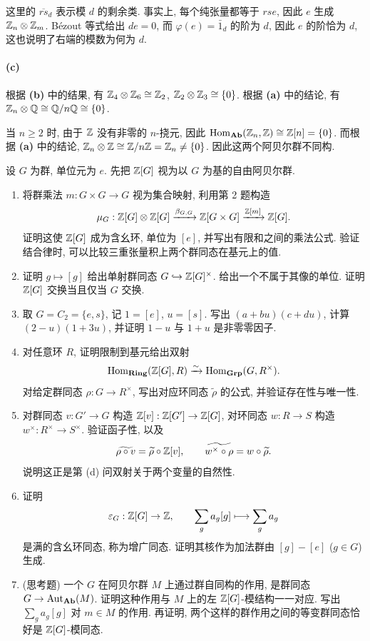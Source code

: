\documentclass{article}
\begin{document}
\begin{solution}
	这里的 $\overline{rs}_d$ 表示模 $d$ 的剩余类. 事实上, 每个纯张量都等于 $rs e$, 因此 $e$ 生成 $\mathbb{Z}_n \otimes \mathbb{Z}_m$. Bézout 等式给出 $de = 0$, 而 $\varphi(e) = \bar{1}_d$ 的阶为 $d$, 因此 $e$ 的阶恰为 $d$, 这也说明了右端的模数为何为 $d$.

	\paragraph{(c)} 根据 \textbf{(b)} 中的结果, 有 $\mathbb{Z}_4 \otimes \mathbb{Z}_6 \cong \mathbb{Z}_2$, $\mathbb{Z}_2 \otimes \mathbb{Z}_3 \cong \{0\}$. 根据 \textbf{(a)} 中的结论, 有 $\mathbb{Z}_n \otimes \mathbb{Q} \cong \mathbb{Q} / n\mathbb{Q} \cong \{0\}	$.

	当 $n \ge 2$ 时, 由于 $\mathbb{Z}$ 没有非零的 $n$-挠元, 因此 $\operatorname{Hom}_{\mathbf{Ab}}(\mathbb{Z}_n, \mathbb{Z}) \cong \mathbb{Z}[n] = \{0\}$. 而根据 \textbf{(a)} 中的结论, $\mathbb{Z}_n \otimes \mathbb{Z} \cong \mathbb{Z}/n\mathbb{Z} = \mathbb{Z}_n \neq \{0\}$. 因此这两个阿贝尔群不同构.
\end{solution}



\begin{problem}
设 $G$ 为群, 单位元为 $e$. 先把 $\mathbb{Z}[G]$ 视为以 $G$ 为基的自由阿贝尔群.
\begin{enumerate}
  \item[(a)] 将群乘法 $m:G\times G\to G$ 视为集合映射, 利用第 2 题构造
  \[
    \mu_G:\mathbb{Z}[G]\otimes\mathbb{Z}[G]\xrightarrow{\beta_{G,G}}\mathbb{Z}[G\times G]
    \xrightarrow{\mathbb{Z}[m]}\mathbb{Z}[G].
  \]
  证明这使 $\mathbb{Z}[G]$ 成为含幺环, 单位为 $[e]$, 并写出有限和之间的乘法公式. 验证结合律时, 可以比较三重张量积上两个群同态在基元上的值.
  \item[(b)] 证明 $g\mapsto[g]$ 给出单射群同态 $G\hookrightarrow\mathbb{Z}[G]^\times$. 给出一个不属于其像的单位. 证明 $\mathbb{Z}[G]$ 交换当且仅当 $G$ 交换.
  \item[(c)] 取 $G=C_2=\{e,s\}$, 记 $1=[e]$, $u=[s]$. 写出 $(a+bu)(c+du)$, 计算 $(2-u)(1+3u)$, 并证明 $1-u$ 与 $1+u$ 是非零零因子.
  \item[(d)] 对任意环 $R$, 证明限制到基元给出双射
  \[
    \operatorname{Hom}_{\mathbf{Ring}}(\mathbb{Z}[G],R)\xrightarrow{\sim}\operatorname{Hom}_{\mathbf{Grp}}(G,R^\times).
  \]
  对给定群同态 $\rho:G\to R^\times$, 写出对应环同态 $\widetilde\rho$ 的公式, 并验证存在性与唯一性.
  \item[(e)] 对群同态 $v:G'\to G$ 构造 $\mathbb{Z}[v]:\mathbb{Z}[G']\to\mathbb{Z}[G]$, 对环同态 $w:R\to S$ 构造 $w^\times:R^\times\to S^\times$. 验证函子性, 以及
  \[
    \widetilde{\rho\circ v}=\widetilde\rho\circ\mathbb{Z}[v],\qquad
    \widetilde{w^\times\circ\rho}=w\circ\widetilde\rho.
  \]
  说明这正是第 (d) 问双射关于两个变量的自然性.
  \item[(f)] 证明
  \[
    \varepsilon_G:\mathbb{Z}[G]\to\mathbb{Z},\qquad
    \sum_g a_g[g]\longmapsto\sum_g a_g
  \]
  是满的含幺环同态, 称为增广同态. 证明其核作为加法群由 $[g]-[e]$ ($g\in G$) 生成.
  \item[(g)] ({\heiti 思考题}) 一个 $G$ 在阿贝尔群 $M$ 上通过群自同构的作用, 是群同态 $G\to\operatorname{Aut}_{\mathbf{Ab}}(M)$. 证明这种作用与 $M$ 上的左 $\mathbb{Z}[G]$-模结构一一对应. 写出 $\sum_g a_g[g]$ 对 $m\in M$ 的作用. 再证明, 两个这样的群作用之间的等变群同态恰好是 $\mathbb{Z}[G]$-模同态.
\end{enumerate}
\end{problem}
\end{document}
